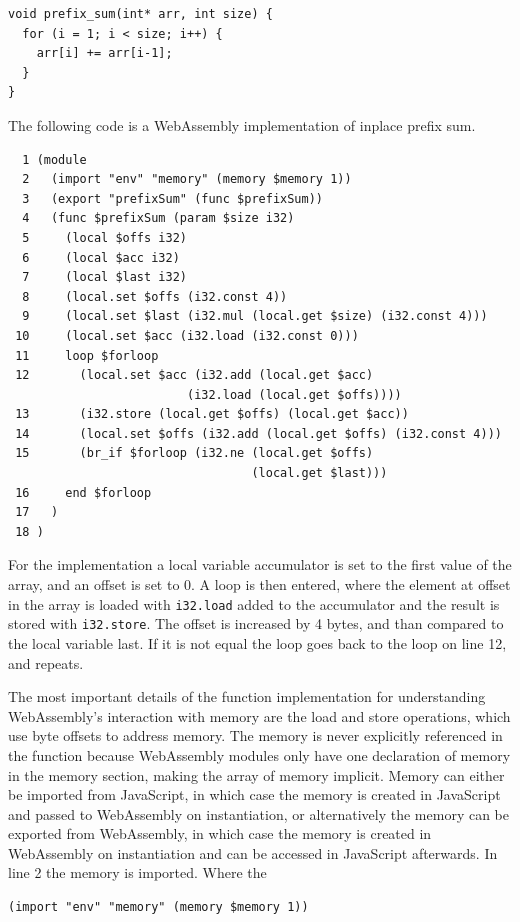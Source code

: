 \documentclass[11pt]{book}
\begin{document}
\begin{verbatim}
void prefix_sum(int* arr, int size) {
  for (i = 1; i < size; i++) {
    arr[i] += arr[i-1];
  }
}
\end{verbatim}
The following code is a WebAssembly implementation of inplace prefix sum.
\begin{verbatim}
  1 (module
  2   (import "env" "memory" (memory $memory 1))
  3   (export "prefixSum" (func $prefixSum))
  4   (func $prefixSum (param $size i32)
  5     (local $offs i32)
  6     (local $acc i32)
  7     (local $last i32)
  8     (local.set $offs (i32.const 4))
  9     (local.set $last (i32.mul (local.get $size) (i32.const 4)))
 10     (local.set $acc (i32.load (i32.const 0)))
 11     loop $forloop
 12       (local.set $acc (i32.add (local.get $acc) 
                         (i32.load (local.get $offs))))
 13       (i32.store (local.get $offs) (local.get $acc))
 14       (local.set $offs (i32.add (local.get $offs) (i32.const 4)))
 15       (br_if $forloop (i32.ne (local.get $offs) 
                                  (local.get $last)))
 16     end $forloop
 17   )
 18 )
\end{verbatim}

For the implementation a local variable accumulator is set to the first value of the array, and an offset is set to 0. A loop is then entered, where the element at offset in the array is loaded with \texttt{i32.load} added to the accumulator and the result is stored with \texttt{i32.store}. The offset is increased by 4 bytes, and than compared to the local variable last. If it is not equal the loop goes back to the loop on line 12, and repeats.

The most important details of the function implementation for understanding WebAssembly's interaction with memory are the load and store operations, which use byte offsets to address memory. The memory is never explicitly referenced in the function because WebAssembly modules only have one declaration of memory in the memory section, making the array of memory implicit. Memory can either be imported from JavaScript, in which case the memory is created in JavaScript and passed to WebAssembly on instantiation, or alternatively the memory can be exported from WebAssembly, in which case the memory is created in WebAssembly on instantiation and can be accessed in JavaScript afterwards. In line 2 the memory is imported. Where the 
\begin{verbatim}
(import "env" "memory" (memory $memory 1))
\end{verbatim}
\end{document}
